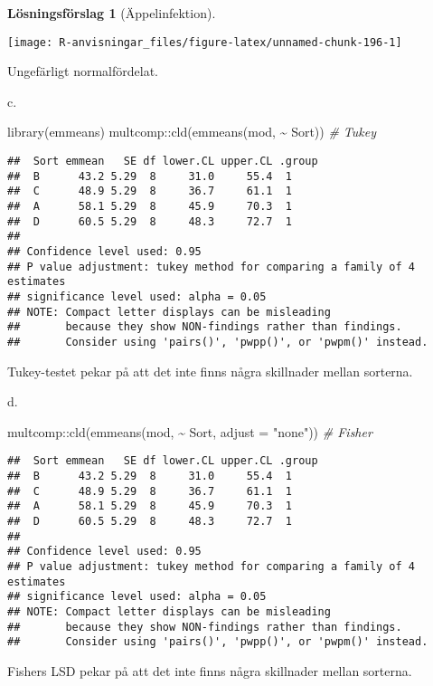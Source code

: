 \documentclass[
]{book}
\newenvironment{Shaded}{\begin{snugshade}}{\end{snugshade}}
\newcommand{\AttributeTok}[1]{\textcolor[rgb]{0.77,0.63,0.00}{#1}}
\newcommand{\CommentTok}[1]{\textcolor[rgb]{0.56,0.35,0.01}{\textit{#1}}}
\newcommand{\FunctionTok}[1]{\textcolor[rgb]{0.00,0.00,0.00}{#1}}
\newcommand{\NormalTok}[1]{#1}
\newcommand{\SpecialCharTok}[1]{\textcolor[rgb]{0.00,0.00,0.00}{#1}}
\newcommand{\StringTok}[1]{\textcolor[rgb]{0.31,0.60,0.02}{#1}}
\theoremstyle{definition}
\theoremstyle{definition}
\theoremstyle{definition}
\theoremstyle{definition}
\newtheorem{hypothesis}{Lösningsförslag}[chapter]
\theoremstyle{remark}
\begin{document}
\begin{hypothesis}[Äppelinfektion]
\begin{center}\texttt{[image: R-anvisningar\_files/figure-latex/unnamed-chunk-196-1]} \end{center}

Ungefärligt normalfördelat.

c.

\begin{Shaded}
\begin{Highlighting}[]
\FunctionTok{library}\NormalTok{(emmeans)}
\NormalTok{multcomp}\SpecialCharTok{::}\FunctionTok{cld}\NormalTok{(}\FunctionTok{emmeans}\NormalTok{(mod, }\SpecialCharTok{\textasciitilde{}}\NormalTok{ Sort)) }\CommentTok{\# Tukey}
\end{Highlighting}
\end{Shaded}

\begin{verbatim}
##  Sort emmean   SE df lower.CL upper.CL .group
##  B      43.2 5.29  8     31.0     55.4  1    
##  C      48.9 5.29  8     36.7     61.1  1    
##  A      58.1 5.29  8     45.9     70.3  1    
##  D      60.5 5.29  8     48.3     72.7  1    
## 
## Confidence level used: 0.95 
## P value adjustment: tukey method for comparing a family of 4 estimates 
## significance level used: alpha = 0.05 
## NOTE: Compact letter displays can be misleading
##       because they show NON-findings rather than findings.
##       Consider using 'pairs()', 'pwpp()', or 'pwpm()' instead.
\end{verbatim}

Tukey-testet pekar på att det inte finns några skillnader mellan sorterna.

d.

\begin{Shaded}
\begin{Highlighting}[]
\NormalTok{multcomp}\SpecialCharTok{::}\FunctionTok{cld}\NormalTok{(}\FunctionTok{emmeans}\NormalTok{(mod, }\SpecialCharTok{\textasciitilde{}}\NormalTok{ Sort, }\AttributeTok{adjust =} \StringTok{"none"}\NormalTok{)) }\CommentTok{\# Fisher}
\end{Highlighting}
\end{Shaded}

\begin{verbatim}
##  Sort emmean   SE df lower.CL upper.CL .group
##  B      43.2 5.29  8     31.0     55.4  1    
##  C      48.9 5.29  8     36.7     61.1  1    
##  A      58.1 5.29  8     45.9     70.3  1    
##  D      60.5 5.29  8     48.3     72.7  1    
## 
## Confidence level used: 0.95 
## P value adjustment: tukey method for comparing a family of 4 estimates 
## significance level used: alpha = 0.05 
## NOTE: Compact letter displays can be misleading
##       because they show NON-findings rather than findings.
##       Consider using 'pairs()', 'pwpp()', or 'pwpm()' instead.
\end{verbatim}

Fishers LSD pekar på att det inte finns några skillnader mellan sorterna.
\end{hypothesis}
\end{document}
